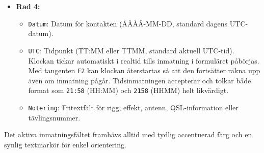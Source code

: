 \documentclass[11pt,a4paper]{article}
\begin{document}
\begin{itemize}
\begin{itemize}
    \end{itemize}
    \item \textbf{Rad 4:}
    \begin{itemize}
        \item \texttt{Datum}: Datum för kontakten (ÅÅÅÅ-MM-DD, standard dagens UTC-datum).
        \item \texttt{UTC}: Tidpunkt (TT:MM eller TTMM, standard aktuell UTC-tid). Klockan tickar automatiskt i realtid tills inmatning i formuläret påbörjas. Med tangenten \texttt{F2} kan klockan återstartas så att den fortsätter räkna upp även om inmatning pågår. Tidsinmatningen accepterar och tolkar både format som \texttt{21:58} (HH:MM) och \texttt{2158} (HHMM) helt likvärdigt.
        \item \texttt{Notering}: Fritextfält för rigg, effekt, antenn, QSL-information eller tävlingsnummer.
    \end{itemize}
\end{itemize}
Det aktiva inmatningsfältet framhävs alltid med tydlig accentuerad färg och en synlig textmarkör för enkel orientering.
\end{document}
